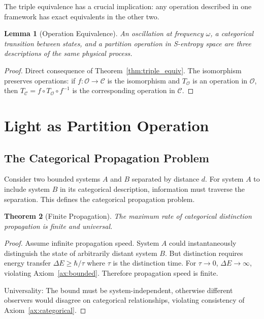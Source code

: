 \documentclass[aps,prd,twocolumn,superscriptaddress,floatfix,nofootinbib]{revtex4-2}
\newtheorem{theorem}{Theorem}[section]
\newtheorem{lemma}[theorem]{Lemma}
\theoremstyle{remark}
\newcommand{\Ocat}{\mathcal{O}}
\newcommand{\Ccat}{\mathcal{C}}
\begin{document}
The triple equivalence has a crucial implication: any operation described in one framework has exact equivalents in the other two.

\begin{lemma}[Operation Equivalence]
\label{lem:operation_equiv}
An oscillation at frequency $\omega$, a categorical transition between states, and a partition operation in S-entropy space are three descriptions of the same physical process.
\end{lemma}

\begin{proof}
Direct consequence of Theorem~\ref{thm:triple_equiv}. The isomorphism preserves operations: if $f: \Ocat \to \Ccat$ is the isomorphism and $T_\Ocat$ is an operation in $\Ocat$, then $T_\Ccat = f \circ T_\Ocat \circ f^{-1}$ is the corresponding operation in $\Ccat$.
\end{proof}

\section{Light as Partition Operation}
\label{sec:light}

\subsection{The Categorical Propagation Problem}

Consider two bounded systems $A$ and $B$ separated by distance $d$. For system $A$ to include system $B$ in its categorical description, information must traverse the separation. This defines the categorical propagation problem.

\begin{theorem}[Finite Propagation]
\label{thm:finite_prop}
The maximum rate of categorical distinction propagation is finite and universal.
\end{theorem}

\begin{proof}
Assume infinite propagation speed. System $A$ could instantaneously distinguish the state of arbitrarily distant system $B$. But distinction requires energy transfer $\Delta E \geq \hbar/\tau$ where $\tau$ is the distinction time. For $\tau \to 0$, $\Delta E \to \infty$, violating Axiom~\ref{ax:bounded}. Therefore propagation speed is finite.

Universality: The bound must be system-independent, otherwise different observers would disagree on categorical relationships, violating consistency of Axiom~\ref{ax:categorical}.
\end{proof}
\end{document}
